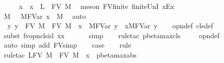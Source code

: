 \begin{isabellebody}
\ \ \isamarkupfalse%
\ \isamarkupfalse%
\ x\ \ {}{\isacharcolon}{\isachardoublequoteopen}x\ {\isasymnotin}\ L\ {\isasymunion}\ FV\ M{\isachardoublequoteclose}\ \isamarkupfalse%
\ {\isacharparenleft}meson\ FV{\isacharunderscore}finite\ finite{\isacharunderscore}UnI\ x{\isacharunderscore}Ex{\isacharparenright}\isanewline
\ \ \isamarkupfalse%
\ {}\ \isamarkupfalse%
\ M{\isacharprime}\ \ {}{\isacharcolon}\ {\isachardoublequoteopen}M{\isacharcircum}FVar\ x\ {\isachargreater}{\isachargreater}{\isachargreater}\ M{\isacharprime}{\isachardoublequoteclose}\ \isamarkupfalse%
\ auto\isanewline
\isanewline
\ \ \isamarkupfalse%
\ {}{\isacharcolon}\ {\isachardoublequoteopen}{\isasymAnd}y{\isachardot}\ y\ {\isasymnotin}\ FV\ M{\isacharprime}\ {\isasymunion}\ FV\ M\ {\isasymunion}\ {\isacharbraceleft}x{\isacharbraceright}\ {\isasymLongrightarrow}\ M{\isacharcircum}FVar\ y\ {\isachargreater}{\isachargreater}{\isachargreater}\ {\isacharparenleft}{\isacharbackslash}x{\isacharcircum}M{\isacharprime}{\isacharparenright}{\isacharcircum}FVar\ y{\isachardoublequoteclose}\isanewline
\ \ \isamarkupfalse%
\ opn{\isacharprime}{\isacharunderscore}def\ cls{\isacharprime}{\isacharunderscore}def\ \isanewline
\ \ \isamarkupfalse%
\ {\isacharparenleft}subst{\isacharparenleft}{}{\isacharparenright}\ fv{\isacharunderscore}opn{\isacharunderscore}cls{\isacharunderscore}id{}{\isacharbrackleft}\ x{\isacharequal}x{\isacharbrackright}{\isacharparenright}\isanewline
\ \ \isamarkupfalse%
\ {}\ \isamarkupfalse%
\ simp\isanewline
\ \ \isamarkupfalse%
\ {\isacharparenleft}rule{\isacharunderscore}tac\ pbeta{\isacharunderscore}max{\isacharunderscore}cls{\isacharparenright}\isanewline
\ \ \isamarkupfalse%
\ {}\ opn{\isacharprime}{\isacharunderscore}def\ \isamarkupfalse%
\ {\isacharparenleft}auto\ simp\ add{\isacharcolon}\ FV{\isacharunderscore}simp{\isacharparenright}\isanewline
\isanewline
\ \ \isamarkupfalse%
\ {\isacharquery}case\isanewline
\ \ \isamarkupfalse%
\ rule\isanewline
\ \ \isamarkupfalse%
\ {\isacharparenleft}rule{\isacharunderscore}tac\ L{\isacharequal}{\isachardoublequoteopen}FV\ M{\isacharprime}\ {\isasymunion}\ FV\ M\ {\isasymunion}\ {\isacharbraceleft}x{\isacharbraceright}{\isachardoublequoteclose}\ \ pbeta{\isacharunderscore}max{\isachardot}abs{\isacharparenright}\isanewline

\end{isabellebody}
